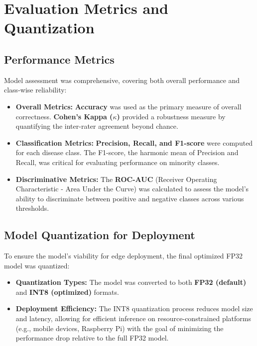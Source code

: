 \documentclass[12pt, a4paper]{report}
\begin{document}
\section{Evaluation Metrics and Quantization}
\label{sec:evaluation_quantization}

\subsection*{Performance Metrics} %
\noindent
Model assessment was comprehensive, covering both overall performance and class-wise reliability:
\begin{itemize}
    \item \textbf{Overall Metrics:} \textbf{Accuracy} was used as the primary measure of overall correctness. \textbf{Cohen's Kappa ($\kappa$)} provided a robustness measure by quantifying the inter-rater agreement beyond chance.
    \item \textbf{Classification Metrics:} \textbf{Precision, Recall, and F1-score} were computed for each disease class. The F1-score, the harmonic mean of Precision and Recall, was critical for evaluating performance on minority classes.
    \item \textbf{Discriminative Metrics:} The \textbf{ROC-AUC} (Receiver Operating Characteristic - Area Under the Curve) was calculated to assess the model's ability to discriminate between positive and negative classes across various thresholds.
\end{itemize}

\subsection*{Model Quantization for Deployment} %
\noindent
To ensure the model's viability for edge deployment, the final optimized FP32 model was quantized:
\begin{itemize}
    \item \textbf{Quantization Types:} The model was converted to both \textbf{FP32 (default)} and \textbf{INT8 (optimized)} formats.
    \item \textbf{Deployment Efficiency:} The INT8 quantization process reduces model size and latency, allowing for efficient inference on resource-constrained platforms (e.g., mobile devices, Raspberry Pi) with the goal of minimizing the performance drop relative to the full FP32 model.
\end{itemize}
\end{document}
